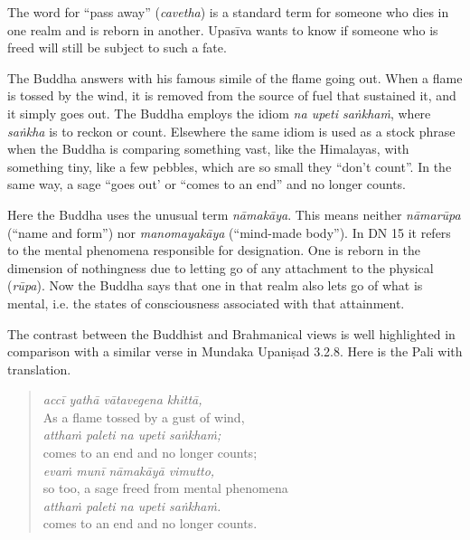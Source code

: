 \documentclass[12pt,openany]{book}%
\begin{document}
The word for “pass away” (\textit{cavetha}) is a standard term for someone who dies in one realm and is reborn in another. \textsanskrit{Upasīva} wants to know if someone who is freed will still be subject to such a fate.

The Buddha answers with his famous simile of the flame going out. When a flame is tossed by the wind, it is removed from the source of fuel that sustained it, and it simply goes out. The Buddha employs the idiom \textit{na upeti \textsanskrit{saṅkhaṁ}}, where \textit{\textsanskrit{saṅkha}} is to reckon or count. Elsewhere the same idiom is used as a stock phrase when the Buddha is comparing something vast, like the Himalayas, with something tiny, like a few pebbles, which are so small they “don’t count”. In the same way, a sage “goes out’ or “comes to an end” and no longer counts.

Here the Buddha uses the unusual term \textit{\textsanskrit{nāmakāya}}. This means neither \textit{\textsanskrit{nāmarūpa}} (“name and form”) nor \textit{\textsanskrit{manomayakāya}} (“mind-made body”). In DN 15 it refers to the mental phenomena responsible for designation. One is reborn in the dimension of nothingness due to letting go of any attachment to the physical (\textit{\textsanskrit{rūpa}}). Now the Buddha says that one in that realm also lets go of what is mental, i.e. the states of consciousness associated with that attainment.

The contrast between the Buddhist and Brahmanical views is well highlighted in comparison with a similar verse in Mundaka \textsanskrit{Upaniṣad} 3.2.8. Here is the Pali with translation.

\begin{verse}%
\textit{\textsanskrit{accī} \textsanskrit{yathā} \textsanskrit{vātavegena} \textsanskrit{khittā},} \\
As a flame tossed by a gust of wind, \\
\textit{\textsanskrit{atthaṁ} paleti na upeti \textsanskrit{saṅkhaṁ};} \\
comes to an end and no longer counts; \\
\textit{\textsanskrit{evaṁ} \textsanskrit{munī} \textsanskrit{nāmakāyā} vimutto,} \\
so too, a sage freed from mental phenomena \\
\textit{\textsanskrit{atthaṁ} paleti na upeti \textsanskrit{saṅkhaṁ}.} \\
comes to an end and no longer counts.

%
\end{verse}
\end{document}
